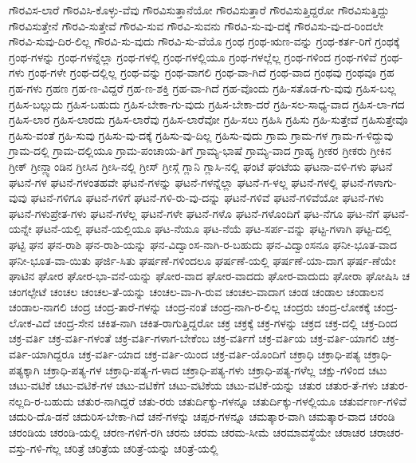 {ಗೌರವಿಸ-ಲಾರೆ
ಗೌರವಿಸಿ-ಕೊಳ್ಳು-ವೆವು
ಗೌರವಿಸುತ್ತಾನೆಯೋ
ಗೌರವಿಸುತ್ತಾರೆ
ಗೌರವಿಸುತ್ತಿದ್ದರೋ
ಗೌರವಿಸುತ್ತಿದ್ದು
ಗೌರವಿಸುತ್ತೇನೆ
ಗೌರವಿ-ಸುತ್ತೇವೆ
ಗೌರವಿ-ಸುವ
ಗೌರವಿ-ಸುವನು
ಗೌರವಿ-ಸು-ವು-ದಕ್ಕೆ
ಗೌರವಿಸು-ವು-ದ-ರಿಂದಲೇ
ಗೌರವಿ-ಸುವು-ದಿರ-ಲಿಲ್ಲ
ಗೌರವಿ-ಸು-ವುದು
ಗೌರವಿ-ಸು-ವೆಯೊ
ಗ್ರಂಥ
ಗ್ರಂಥ-ಋಣ-ವನ್ನು
ಗ್ರಂಥ-ಕರ್ತ-ರಿಗೆ
ಗ್ರಂಥಕ್ಕೆ
ಗ್ರಂಥ-ಗಳನ್ನು
ಗ್ರಂಥ-ಗಳನ್ನೆಲ್ಲಾ
ಗ್ರಂಥ-ಗಳಲ್ಲಿ
ಗ್ರಂಥ-ಗಳಲ್ಲಿಯೂ
ಗ್ರಂಥ-ಗಳಲ್ಲೆಲ್ಲ
ಗ್ರಂಥ-ಗಳಿಂದ
ಗ್ರಂಥ-ಗಳಿವೆ
ಗ್ರಂಥ-ಗಳು
ಗ್ರಂಥ-ಗಳೇ
ಗ್ರಂಥ-ದಲ್ಲಿಲ್ಲ
ಗ್ರಂಥ-ವನ್ನು
ಗ್ರಂಥ-ವಾಗಲಿ
ಗ್ರಂಥ-ವಾ-ಗಿದೆ
ಗ್ರಂಥ-ವಾದ
ಗ್ರಂಥವು
ಗ್ರಂಥವೂ
ಗ್ರಹ
ಗ್ರಹ-ಗಳು
ಗ್ರಹಣ
ಗ್ರಹ-ಣ-ವಿದ್ದರೆ
ಗ್ರಹ-ಣ-ಶಕ್ತಿ
ಗ್ರಹ-ವಾ-ಗಿದೆ
ಗ್ರಹ-ವೊಂದು
ಗ್ರಹಿ-ಸತೊಡ-ಗು-ವುವು
ಗ್ರಹಿಸ-ಬಲ್ಲ
ಗ್ರಹಿಸ-ಬಲ್ಲುದು
ಗ್ರಹಿಸ-ಬಹುದು
ಗ್ರಹಿಸ-ಬೇಕಾ-ಗು-ವುದು
ಗ್ರಹಿಸ-ಬೇಕಾ-ದರೆ
ಗ್ರಹಿ-ಸಲ-ಸಾಧ್ಯ-ವಾದ
ಗ್ರಹಿಸ-ಲಾ-ಗದ
ಗ್ರಹಿಸ-ಲಾರ
ಗ್ರಹಿಸ-ಲಾರದು
ಗ್ರಹಿಸ-ಲಾರೆವು
ಗ್ರಹಿಸ-ಲಾರೆವೋ
ಗ್ರಹಿ-ಸಲು
ಗ್ರಹಿಸಿ
ಗ್ರಹಿಸು
ಗ್ರಹಿ-ಸುತ್ತೇವೆ
ಗ್ರಹಿಸುತ್ತೇವೊ
ಗ್ರಹಿಸು-ವಂತೆ
ಗ್ರಹಿ-ಸುವು
ಗ್ರಹಿಸು-ವು-ದಕ್ಕೆ
ಗ್ರಹಿಸು-ವು-ದಿಲ್ಲ
ಗ್ರಹಿಸು-ವುದು
ಗ್ರಾಮ
ಗ್ರಾಮ-ಗಳ
ಗ್ರಾಮ-ಗ-ಳಿದ್ದುವು
ಗ್ರಾಮ-ದಲ್ಲಿ
ಗ್ರಾಮ-ದಲ್ಲಿಯೂ
ಗ್ರಾಮ-ಪಂಚಾಯ-ತಿಗೆ
ಗ್ರಾಮ್ಯ-ಭಾಷೆ
ಗ್ರಾಮ್ಯ-ವಾದ
ಗ್ರಾಹ್ಯ
ಗ್ರೀಕರ
ಗ್ರೀಕರು
ಗ್ರೀಕಿನ
ಗ್ರೀಕ್
ಗ್ರೀನ್ಲ್ಯಾಂಡಿನ
ಗ್ರೀಸಿನ
ಗ್ರೀಸಿ-ನಲ್ಲಿ
ಗ್ರೀಸ್
ಗ್ರೀಸ್ಗೆ
ಗ್ಲಾನಿ
ಗ್ಲಾಸಿ-ನಲ್ಲಿ
ಘಂಟೆ
ಘಂಟೆಯ
ಘಟನಾ-ವಳಿ-ಗಳು
ಘಟನೆ
ಘಟನೆ-ಗಳ
ಘಟನೆ-ಗಳಂತಹವೇ
ಘಟನೆ-ಗಳನ್ನು
ಘಟನೆ-ಗಳನ್ನೆಲ್ಲಾ
ಘಟನೆ-ಗ-ಳಲ್ಲ
ಘಟನೆ-ಗಳಲ್ಲಿ
ಘಟನೆ-ಗಳಾಗು-ವುವು
ಘಟನೆ-ಗಳಿಗೂ
ಘಟನೆ-ಗಳಿಗೆ
ಘಟನೆ-ಗಳಿ-ರು-ವು-ದನ್ನು
ಘಟನೆ-ಗಳಿವೆ
ಘಟನೆ-ಗಳಿವೆಯೋ
ಘಟನೆ-ಗಳು
ಘಟನೆ-ಗಳುಪ್ರೇತ-ಗಳು
ಘಟನೆ-ಗಳೆಲ್ಲ
ಘಟನೆ-ಗಳೇ
ಘಟನೆ-ಗಳೊ
ಘಟನೆ-ಗಳೊಂದಿಗೆ
ಘಟ-ನೆಗೂ
ಘಟ-ನೆಗೆ
ಘಟನೆ-ಯನ್ನೇ
ಘಟನೆ-ಯಲ್ಲಿ
ಘಟನೆ-ಯಲ್ಲಿಯೂ
ಘಟ-ನೆಯೂ
ಘಟ-ನೆಯೆ
ಘಟ-ಸರ್ಪ-ವನ್ನು
ಘಟ್ಟ-ಗಳಾಗಿ
ಘಟ್ಟ-ದಲ್ಲಿ
ಘಟ್ಟಿ
ಘನ
ಘನ-ರಾಶಿ
ಘನ-ರಾಶಿ-ಯನ್ನು
ಘನ-ವಿದ್ವಾಂಸ-ನಾಗಿ-ರ-ಬಹುದು
ಘನ-ವಿದ್ವಾಂಸನೂ
ಘನೀ-ಭೂತ-ವಾದ
ಘನೀ-ಭೂತ-ವಾ-ಯಿತು
ಘರ್ಜಿ-ಸಿತು
ಘರ್ಷಣೆ-ಗಳಿಂದಲೂ
ಘರ್ಷಣೆ-ಯಲ್ಲಿ
ಘರ್ಷಣೆ-ಯಾ-ದಾಗ
ಘರ್ಷ-ಣೆಯೇ
ಘಾಟಿನ
ಘೋರ
ಘೋರ-ಭಾ-ವನೆ-ಯನ್ನು
ಘೋರ-ವಾದ
ಘೋರ-ವಾದದು
ಘೋರ-ವಾದುದು
ಘೋರಾ
ಘೋಷಿಸಿ
ಚ
ಚಂಗಲ್ಪೇಟೆ
ಚಂಚಲ
ಚಂಚಲ-ತೆ-ಯನ್ನು
ಚಂಚಲ-ವಾ-ಗಿ-ರುವ
ಚಂಚಲ-ವಾದಾಗ
ಚಂಡ
ಚಂಡಾಲ
ಚಂಡಾಲನ
ಚಂಡಾಲ-ನಾಗಲಿ
ಚಂದ್ರ
ಚಂದ್ರ-ತಾರೆ-ಗಳನ್ನು
ಚಂದ್ರ-ನಂತೆ
ಚಂದ್ರ-ನಾಗಿ-ರ-ಲಿಲ್ಲ
ಚಂದ್ರರು
ಚಂದ್ರ-ಲೋಕಕ್ಕೆ
ಚಂದ್ರ-ಲೋಕ-ವಿದೆ
ಚಂದ್ರ-ಸೇನ
ಚಕಿತ-ನಾಗಿ
ಚಕಿತ-ರಾಗುತ್ತಿದ್ದರೋ
ಚಕ್ರ
ಚಕ್ರಕ್ಕೆ
ಚಕ್ರ-ಗಳನ್ನು
ಚಕ್ರದ
ಚಕ್ರ-ದಲ್ಲಿ
ಚಕ್ರ-ದಿಂದ
ಚಕ್ರ-ವರ್ತಿ
ಚಕ್ರ-ವರ್ತಿ-ಗಳಂತೆ
ಚಕ್ರ-ವರ್ತಿ-ಗಳಾಗ-ಬೇಕೆಂಬ
ಚಕ್ರ-ವರ್ತಿಗೆ
ಚಕ್ರ-ವರ್ತಿಯ
ಚಕ್ರ-ವರ್ತಿ-ಯಾಗಲಿ
ಚಕ್ರ-ವರ್ತಿ-ಯಾಗಿದ್ದರೂ
ಚಕ್ರ-ವರ್ತಿ-ಯಾದ
ಚಕ್ರ-ವರ್ತಿ-ಯಿಂದ
ಚಕ್ರ-ವರ್ತಿ-ಯೊಂದಿಗೆ
ಚಕ್ರಾಧಿ
ಚಕ್ರಾಧಿ-ಪತ್ಯ
ಚಕ್ರಾಧಿ-ಪತ್ಯಕ್ಕಾಗಿ
ಚಕ್ರಾಧಿ-ಪತ್ಯ-ಗಳ
ಚಕ್ರಾಧಿ-ಪತ್ಯ-ಗ-ಳಾದ
ಚಕ್ರಾಧಿ-ಪತ್ಯ-ಗಳು
ಚಕ್ರಾಧಿ-ಪತ್ಯ-ಗಳೆಲ್ಲ
ಚಕ್ಷು-ಗಳಿಂದ
ಚಟು
ಚಟು-ವಟಿಕೆ
ಚಟು-ವಟಿಕೆ-ಗಳ
ಚಟು-ವಟಿಕೆಗೆ
ಚಟು-ವಟಿಕೆಯ
ಚಟು-ವಟಿಕೆ-ಯನ್ನು
ಚತುರ
ಚತುರ-ತೆ-ಗಳು
ಚತುರ-ನಲ್ಲದಿ-ರ-ಬಹುದು
ಚತುರ-ನಾಗಿದ್ದರೆ
ಚತು-ರರು
ಚತುರ್ದಿಕ್ಕು-ಗಳನ್ನೂ
ಚತುರ್ದಿಕ್ಕು-ಗಳಲ್ಲಿಯೂ
ಚತುರ್ವರ್ಣ-ಗಳಿವೆ
ಚದುರಿ-ದೊ-ಡನೆ
ಚದುರಿಸ-ಬೇಕಾ-ಗಿದೆ
ಚನೆ-ಗಳನ್ನು
ಚಪ್ಪರ-ಗಳನ್ನೂ
ಚಮತ್ಕಾರ-ವಾಗಿ
ಚಮತ್ಕಾರ-ವಾದ
ಚರಂಡಿ
ಚರಂಡಿಯ
ಚರಂಡಿ-ಯಲ್ಲಿ
ಚರಣ-ಗಳಿಗೆ-ರಗಿ
ಚರನು
ಚರಮ
ಚರಮ-ಸೀಮೆ
ಚರಮಾವಸ್ಥೆಯೇ
ಚರಾಚರ
ಚರಾಚರ-ವಸ್ತು-ಗಳಿ-ಗೆಲ್ಲ
ಚರಿತ್ರೆ
ಚರಿತ್ರೆಯ
ಚರಿತ್ರೆ-ಯನ್ನು
ಚರಿತ್ರೆ-ಯಲ್ಲಿ
}
